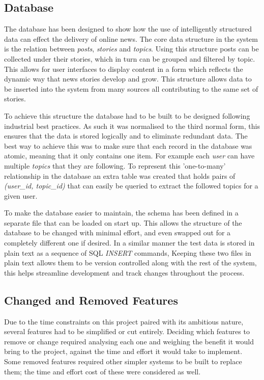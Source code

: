 \documentclass[12pt,titlepage]{article}
\begin{document}
  \subsection{Database}

  The database has been designed to show how the use of intelligently structured
  data can effect the delivery of online news. The core data structure in the
  system is the relation between \textit{posts}, \textit{stories} and
  \textit{topics}. Using this structure posts can be collected under their
  stories, which in turn can be grouped and filtered by topic. This allows for
  user interfaces to display content in a form which reflects the dynamic way
  that news stories develop and grow. This structure allows data to be inserted
  into the system from many sources all contributing to the same set of stories.

  To achieve this structure the database had to be built to be designed
  following industrial best practices. As such it was normalised to the third
  normal form, this ensures that the data is stored logically and to eliminate
  redundant data. The best way to achieve this was to make sure that each record
  in the database was atomic, meaning that it only contains one item. For
  example each \textit{user} can have multiple \textit{topics} that they are
  following. To represent this 'one-to-many' relationship in the database an
  extra table was created that holds pairs of \textit{(user\_id, topic\_id)}
  that can easily be queried to extract the followed topics for a given user.

  To make the database easier to maintain, the schema has been defined in a
  separate file that can be loaded on start up. This allows the structure of the
  database to be changed with minimal effort, and even swapped out for a
  completely different one if desired. In a similar manner the test data is
  stored in plain text as a sequence of SQL \textit{INSERT} commands, Keeping
  these two files in plain text allows them to be version controlled along with
  the rest of the system, this helps streamline development and track changes
  throughout the process.

  \subsection{Changed and Removed Features}

  Due to the time constraints on this project paired with its ambitious nature,
  several features had to be simplified or cut entirely. Deciding which
  features to remove or change required analysing each one and weighing the
  benefit it would bring to the project, against the time and effort it would
  take to implement. Some removed features required other simpler systems to be
  built to replace them; the time and effort cost of these were considered
  as well.
\end{document}
